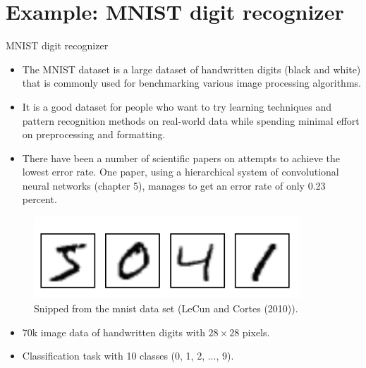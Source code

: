 \section{Example: MNIST digit recognizer}
\begin{vbframe}{MNIST digit recognizer}
  \begin{itemize}
    \item The MNIST dataset is a large dataset of handwritten digits (black and white) that is commonly used for benchmarking various image processing algorithms.
    \item It is a good dataset for people who want to try learning techniques and pattern recognition methods on real-world data while spending minimal effort on preprocessing and formatting.
    \item  There have been a number of scientific papers on attempts to achieve the lowest error rate. One paper, using a hierarchical system of convolutional neural networks (chapter 5), manages to get an error rate of only 0.23 percent.
  \end{itemize}

\framebreak
  \begin{figure}
    \centering
      \includegraphics[width=10cm]{plots/mnist.png}
      \caption{Snipped from the mnist data set (LeCun and Cortes (2010)).}
  \end{figure}
  \begin{itemize}
    \item 70k image data of handwritten digits with $28 \times 28$ pixels.
    \item Classification task with 10 classes (0, 1, 2, ..., 9).
  \end{itemize}




\end{vbframe}
